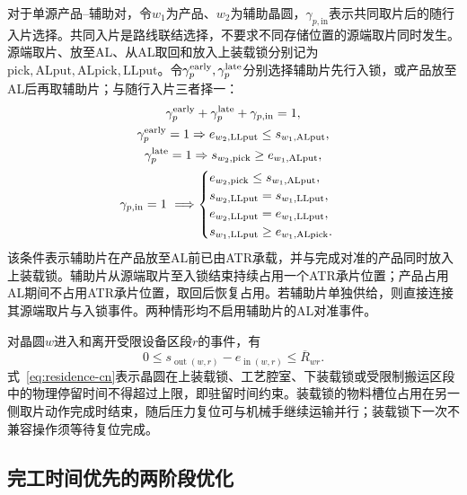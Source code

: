 \documentclass[final,5p,times,twocolumn]{elsarticle}
\begin{document}
对于单源产品--辅助对，令$w_1$为产品、$w_2$为辅助晶圆，$\gamma_{p,\mathrm{in}}$表示共同取片后的随行入片选择。共同入片是路线联结选择，不要求不同存储位置的源端取片同时发生。源端取片、放至AL、从AL取回和放入上装载锁分别记为$\mathrm{pick,ALput,ALpick,LLput}$。令$\gamma^{\rm early}_p,\gamma^{\rm late}_p$分别选择辅助片先行入锁，或产品放至AL后再取辅助片；与随行入片三者择一：
\begin{equation}
\begin{gathered}
\gamma^{\rm early}_p+\gamma^{\rm late}_p+\gamma_{p,\mathrm{in}}=1,\\
\gamma^{\rm early}_p=1\Rightarrow e_{w_2,\mathrm{LLput}}\le s_{w_1,\mathrm{ALput}},\\
\gamma^{\rm late}_p=1\Rightarrow s_{w_2,\mathrm{pick}}\ge e_{w_1,\mathrm{ALput}},\\
\gamma_{p,\mathrm{in}}=1\ \Longrightarrow
\begin{cases}
e_{w_2,\mathrm{pick}}\le s_{w_1,\mathrm{ALput}},\\
s_{w_2,\mathrm{LLput}}=s_{w_1,\mathrm{LLput}},\\
e_{w_2,\mathrm{LLput}}=e_{w_1,\mathrm{LLput}},\\
s_{w_1,\mathrm{LLput}}\ge e_{w_1,\mathrm{ALpick}}.
\end{cases}\end{gathered}
\label{eq:single-source-accompany-cn}
\end{equation}
该条件表示辅助片在产品放至AL前已由ATR承载，并与完成对准的产品同时放入上装载锁。辅助片从源端取片至入锁结束持续占用一个ATR承片位置；产品占用AL期间不占用ATR承片位置，取回后恢复占用。若辅助片单独供给，则直接连接其源端取片与入锁事件。两种情形均不启用辅助片的AL对准事件。

对晶圆$w$进入和离开受限设备区段$r$的事件，有
\begin{equation}
0\le s_{\operatorname{out}(w,r)}-e_{\operatorname{in}(w,r)}
\le\overline R_{wr}.
\label{eq:residence-cn}
\end{equation}
式~\eqref{eq:residence-cn}表示晶圆在上装载锁、工艺腔室、下装载锁或受限制搬运区段中的物理停留时间不得超过上限，即驻留时间约束。装载锁的物料槽位占用在另一侧取片动作完成时结束，随后压力复位可与机械手继续运输并行；装载锁下一次不兼容操作须等待复位完成。

\subsection{完工时间优先的两阶段优化}
\end{document}

